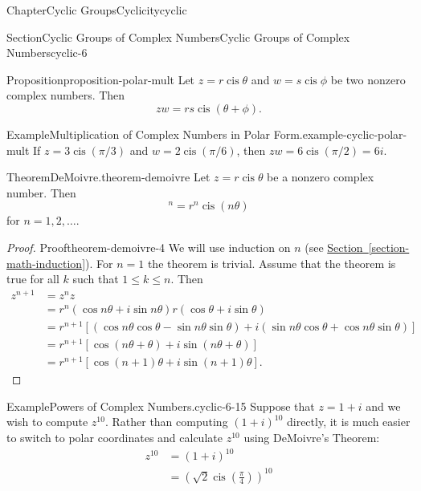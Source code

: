 \documentclass[oneside,10pt,]{book}
\newcommand{\xreffont}{\relax}
\numberwithin{equation}{section}
\newcommand{\cis}{\operatorname{cis}}
\begin{document}
\begin{chapterptx}{Chapter}{Cyclic Groups}{}{Cyclicity}{}{}{cyclic}
\begin{sectionptx}{Section}{Cyclic Groups of Complex Numbers}{}{Cyclic Groups of Complex Numbers}{}{}{cyclic-6}
\begin{proposition}{Proposition}{}{}{proposition-polar-mult}%
Let \(z = r \cis \theta\) and \(w = s \cis \phi\) be two nonzero complex numbers. Then%
\begin{equation*}
zw = r s \cis( \theta + \phi)\text{.}
\end{equation*}
%
\end{proposition}
\begin{example}{Example}{Multiplication of Complex Numbers in Polar Form.}{example-cyclic-polar-mult}%
If \(z =  3 \cis( \pi / 3 )\) and \(w = 2 \cis(\pi / 6 )\), then \(zw = 6 \cis( \pi / 2 ) = 6i\).%
\end{example}
\begin{theorem}{Theorem}{DeMoivre.}{}{theorem-demoivre}%
%
Let \(z = r \cis  \theta\) be a nonzero complex number. Then%
\begin{equation*}
[r \cis \theta  ]^n = r^n \cis( n \theta)
\end{equation*}
for \(n = 1, 2, \ldots\).%
\end{theorem}
\begin{proof}{Proof}{}{theorem-demoivre-4}
We will use induction on \(n\) (see \hyperref[section-math-induction]{Section~{\xreffont\ref{section-math-induction}}}). For \(n = 1\) the theorem is trivial. Assume that the theorem is true for all \(k\) such that \(1  \leq k \leq n\). Then%
\begin{align*}
z^{n+1} & = z^n z\\
& = r^n( \cos  n \theta + i \sin n \theta ) r( \cos \theta + i\sin \theta )\\
& = r^{n+1} [( \cos n \theta \cos \theta - \sin n \theta \sin \theta ) + i ( \sin n \theta \cos \theta + \cos n \theta \sin \theta)]\\
& = r^{n+1} [ \cos( n \theta + \theta) + i \sin( n \theta + \theta) ]\\
& = r^{n+1} [ \cos( n +1) \theta + i \sin( n+1) \theta  ]\text{.}
\end{align*}
%
\end{proof}
\begin{example}{Example}{Powers of Complex Numbers.}{cyclic-6-15}%
Suppose that \(z= 1+i\) and we wish to compute \(z^{10}\). Rather than computing \((1 + i)^{10}\) directly, it is much easier to switch to polar coordinates and calculate \(z^{10}\) using DeMoivre's Theorem:%
\begin{align*}
z^{10} & = (1+i)^{10}\\
& = \left( \sqrt{2} \cis \left( \frac{\pi }{4} \right) \right)^{10}\\

\end{align*}
\end{example}
\end{sectionptx}
\end{chapterptx}
\end{document}
